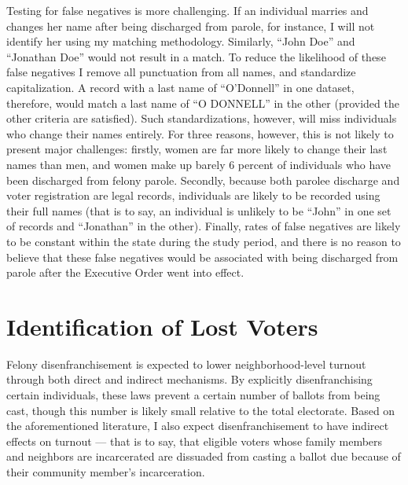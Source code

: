 \documentclass[12pt,]{article}
\begin{document}
Testing for false negatives is more challenging. If an individual marries and changes her name after being discharged from parole, for instance, I will not identify her using my matching methodology. Similarly, ``John Doe'' and ``Jonathan Doe'' would not result in a match. To reduce the likelihood of these false negatives I remove all punctuation from all names, and standardize capitalization. A record with a last name of ``O'Donnell'' in one dataset, therefore, would match a last name of ``O DONNELL'' in the other (provided the other criteria are satisfied). Such standardizations, however, will miss individuals who change their names entirely. For three reasons, however, this is not likely to present major challenges: firstly, women are far more likely to change their last names than men, and women make up barely 6 percent of individuals who have been discharged from felony parole. Secondly, because both parolee discharge and voter registration are legal records, individuals are likely to be recorded using their full names (that is to say, an individual is unlikely to be ``John'' in one set of records and ``Jonathan'' in the other). Finally, rates of false negatives are likely to be constant within the state during the study period, and there is no reason to believe that these false negatives would be associated with being discharged from parole after the Executive Order went into effect.

\hypertarget{identification-of-lost-voters}{%
\section*{Identification of Lost Voters}\label{identification-of-lost-voters}}

Felony disenfranchisement is expected to lower neighborhood-level turnout through both direct and indirect mechanisms. By explicitly disenfranchising certain individuals, these laws prevent a certain number of ballots from being cast, though this number is likely small relative to the total electorate. Based on the aforementioned literature, I also expect disenfranchisement to have indirect effects on turnout --- that is to say, that eligible voters whose family members and neighbors are incarcerated are dissuaded from casting a ballot due because of their community member's incarceration.
\end{document}
